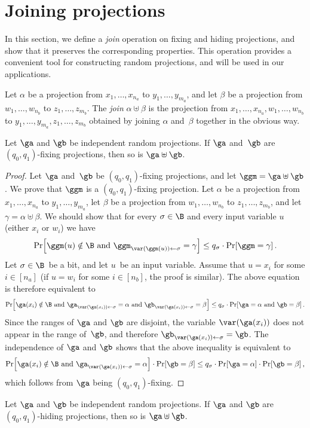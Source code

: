 \documentclass{toc}
\begin{document}
\section{\label{sec:join}Joining projections}

In this section, we define a \emph{join} operation on fixing and hiding
projections, and show that it preserves the corresponding properties.
This operation provides a convenient tool for constructing random
projections, and will be used in our applications.
\begin{definition}
Let $\alpha$ be a projection from $x_{1},\ldots,x_{n_{a}}$ to $y_{1},\ldots,y_{m_{a}}$,
and let $\beta$ be a projection from $w_{1},\ldots,w_{n_{b}}$ to
$z_{1},\ldots,z_{m_{b}}$. The \emph{join} $\alpha\uplus\beta$ is
the projection from $x_{1},\ldots,x_{n_{a}},w_{1},\ldots,w_{n_{b}}$
to $y_{1},\ldots,y_{m_{a}},z_{1},\ldots,z_{m_{b}}$ obtained by joining
$\alpha$ and~$\beta$ together in the obvious way. 
\end{definition}

\begin{lemma}
\label{lemma:concat-fixing}Let $\ga$ and $\gb$ be independent random
projections. If $\ga$ and~$\gb$ are $(q_{0},q_{1})$-fixing projections,
then so is $\ga\uplus\gb$. 
\end{lemma}

\begin{proof}
Let $\ga$ and~$\gb$ be $(q_{0},q_{1})$-fixing projections, and
let $\ggm=\ga\uplus\gb$. We prove that $\ggm$ is a $(q_{0},q_{1})$-fixing
projection. Let $\alpha$ be a projection from $x_{1},\ldots,x_{n_{a}}$
to $y_{1},\ldots,y_{m_{a}}$, let $\beta$ be a projection from $w_{1},\ldots,w_{n_{b}}$
to $z_{1},\ldots,z_{m_{b}}$, and let $\gamma=\alpha\uplus\beta$.
We should show that for every $\sigma\in\B$ and every input variable
$u$ (either $x_{i}$ or $w_{i}$) we have 
\[
\Pr\!\left[\ggm(u)\notin\B\text{ and }\ggm_{\var(\ggm(u))\gets\sigma}=\gamma\right]\leq q_{\sigma}\cdot\Pr\!\left[\ggm=\gamma\right].
\]
Let $\sigma\in\B$~be a bit, and let $u$~be an input variable.
Assume that $u=x_{i}$ for some $i\in\left[n_{a}\right]$ (if $u=w_{i}$
for some $i\in\left[n_{b}\right]$, the proof is similar). The above
equation is therefore equivalent to 
\[
\Pr\!\left[\ga(x_{i})\notin\B\text{ and }\ga_{\var(\ga(x_{i}))\gets\sigma}=\alpha\text{ and }\gb_{\var(\ga(x_{i}))\gets\sigma}=\beta\right]\leq q_{\sigma}\cdot\Pr\!\left[\ga=\alpha\text{ and }\gb=\beta\right].
\]
Since the ranges of $\ga$ and $\gb$ are disjoint, the variable $\var(\ga(x_{i}))$
does not appear in the range of~$\gb$, and therefore $\gb_{\var(\ga(x_{i}))\gets\sigma}=\gb$.
The independence of $\ga$ and $\gb$ shows that the above inequality
is equivalent to 
\[
\Pr\!\left[\ga(x_{i})\notin\B\text{ and }\ga_{\var(\ga(x_{i}))\gets\sigma}=\alpha\right]\cdot\Pr\!\left[\gb=\beta\right]\leq q_{\sigma}\cdot\Pr\!\left[\ga=\alpha\right]\cdot\Pr\!\left[\gb=\beta\right],
\]
which follows from $\ga$ being $(q_{0},q_{1})$-fixing. 
\end{proof}
\begin{lemma}
\label{lemma:concat-hiding}Let $\ga$ and $\gb$ be independent random
projections. If $\ga$ and $\gb$ are $(q_{0},q_{1})$-hiding projections,
then so is $\ga\uplus\gb$. 
\end{lemma}
\end{document}
